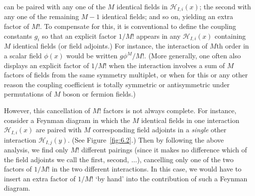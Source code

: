 \noindent can be paired with any one of the $M$ identical fields in
$\mathcal H_{I,i}(x)$; the second with any one of the remaining $M-1$
identical fields; and so on, yielding an extra factor of $M!$. To compensate
for this, it is conventional to define the coupling constants $g_i$ so that an
explicit factor $1/M!$ appears in any $\mathcal H_{I,i}(x)$ containing $M$
identical fields (or field adjoints.) For instance, the interaction of $M$th
order in a scalar field $\phi(x)$ would be written $g\phi^M/M!$. (More
generally, one often also displays an explicit factor of $1/M!$ when the
interaction involves a sum of $M$ factors of fields from the same symmetry
multiplet, or when for this or any other reason the coupling coefficient is
totally symmetric or antisymmetric under permutations of $M$ boson or fermion
fields.)

However, this cancellation of $M!$ factors is not always complete. For
instance, consider a Feynman diagram in which the $M$ identical fields in one
interaction $\mathcal H_{I,i}(x)$ are paired with $M$ corresponding field
adjoints in a \emph{single} other interaction $\mathcal H_{I,j}(y)$. (See
Figure~\ref{fig:6.2}.) Then by following the above analysis, we find only $M!$ different
pairings (since it makes no difference which of the field adjoints we call the
first, second, $\ldots$), cancelling only one of the two factors of $1/M!$ in
the two different interactions. In this case, we would have to insert an extra
factor of $1/M!$ `by hand' into the contribution of such a Feynman diagram.
